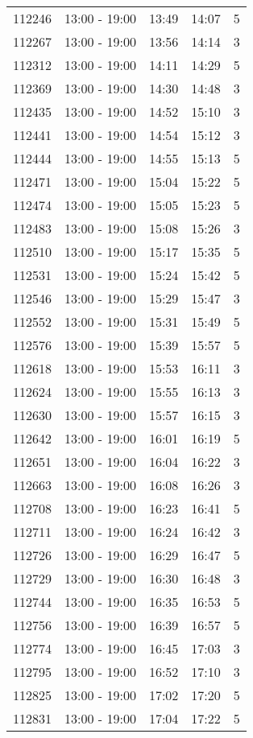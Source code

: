 \documentclass{article}
\begin{document}
\begin{tabular}{llccc}
112246 & 13:00 - 19:00 & 13:49 & 14:07 & 5 \\
112267 & 13:00 - 19:00 & 13:56 & 14:14 & 3 \\
112312 & 13:00 - 19:00 & 14:11 & 14:29 & 5 \\
112369 & 13:00 - 19:00 & 14:30 & 14:48 & 3 \\
112435 & 13:00 - 19:00 & 14:52 & 15:10 & 3 \\
112441 & 13:00 - 19:00 & 14:54 & 15:12 & 3 \\
112444 & 13:00 - 19:00 & 14:55 & 15:13 & 5 \\
112471 & 13:00 - 19:00 & 15:04 & 15:22 & 5 \\
112474 & 13:00 - 19:00 & 15:05 & 15:23 & 5 \\
112483 & 13:00 - 19:00 & 15:08 & 15:26 & 3 \\
112510 & 13:00 - 19:00 & 15:17 & 15:35 & 5 \\
112531 & 13:00 - 19:00 & 15:24 & 15:42 & 5 \\
112546 & 13:00 - 19:00 & 15:29 & 15:47 & 3 \\
112552 & 13:00 - 19:00 & 15:31 & 15:49 & 5 \\
112576 & 13:00 - 19:00 & 15:39 & 15:57 & 5 \\
112618 & 13:00 - 19:00 & 15:53 & 16:11 & 3 \\
112624 & 13:00 - 19:00 & 15:55 & 16:13 & 3 \\
112630 & 13:00 - 19:00 & 15:57 & 16:15 & 3 \\
112642 & 13:00 - 19:00 & 16:01 & 16:19 & 5 \\
112651 & 13:00 - 19:00 & 16:04 & 16:22 & 3 \\
112663 & 13:00 - 19:00 & 16:08 & 16:26 & 3 \\
112708 & 13:00 - 19:00 & 16:23 & 16:41 & 5 \\
112711 & 13:00 - 19:00 & 16:24 & 16:42 & 3 \\
112726 & 13:00 - 19:00 & 16:29 & 16:47 & 5 \\
112729 & 13:00 - 19:00 & 16:30 & 16:48 & 3 \\
112744 & 13:00 - 19:00 & 16:35 & 16:53 & 5 \\
112756 & 13:00 - 19:00 & 16:39 & 16:57 & 5 \\
112774 & 13:00 - 19:00 & 16:45 & 17:03 & 3 \\
112795 & 13:00 - 19:00 & 16:52 & 17:10 & 3 \\
112825 & 13:00 - 19:00 & 17:02 & 17:20 & 5 \\
112831 & 13:00 - 19:00 & 17:04 & 17:22 & 5 \\

\end{tabular}
\end{document}
